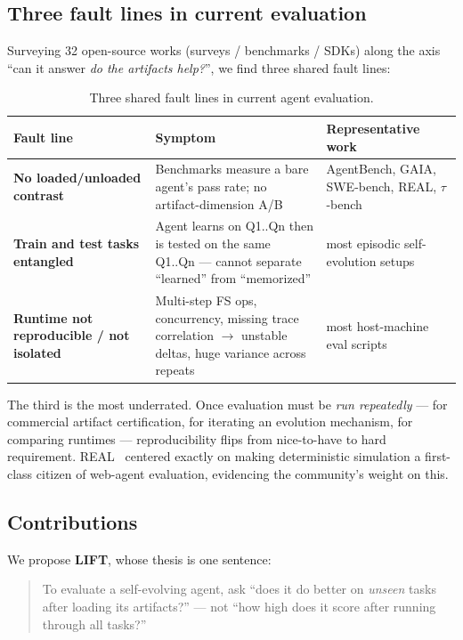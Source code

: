 \documentclass{article}
\begin{document}
\subsection{Three fault lines in current evaluation}

Surveying 32 open-source works (surveys / benchmarks / SDKs) along the axis ``can it answer \emph{do the artifacts help?}'', we find three shared fault lines:

\begin{table}[h]
\centering
\caption{Three shared fault lines in current agent evaluation.}
\label{tab:fault-lines}
\begin{tabular}{P{0.22\textwidth}P{0.42\textwidth}P{0.28\textwidth}}
\toprule
Fault line & Symptom & Representative work \\
\midrule
\textbf{No loaded/unloaded contrast} & Benchmarks measure a bare agent's pass rate; no artifact-dimension A/B & AgentBench, GAIA, SWE-bench, REAL, $\tau$-bench \\
\textbf{Train and test tasks entangled} & Agent learns on Q1..Qn then is tested on the same Q1..Qn --- cannot separate ``learned'' from ``memorized'' & most episodic self-evolution setups \\
\textbf{Runtime not reproducible / not isolated} & Multi-step FS ops, concurrency, missing trace correlation $\rightarrow$ unstable deltas, huge variance across repeats & most host-machine eval scripts \\
\bottomrule
\end{tabular}
\end{table}

The third is the most underrated. Once evaluation must be \emph{run repeatedly} --- for commercial artifact certification, for iterating an evolution mechanism, for comparing runtimes --- reproducibility flips from nice-to-have to hard requirement. REAL~\citep{garg2025real} centered exactly on making deterministic simulation a first-class citizen of web-agent evaluation, evidencing the community's weight on this.

\subsection{Contributions}

We propose \textbf{LIFT}, whose thesis is one sentence:

\begin{quote}
To evaluate a self-evolving agent, ask ``does it do better on \emph{unseen} tasks after loading its artifacts?'' --- not ``how high does it score after running through all tasks?''
\end{quote}
\end{document}
